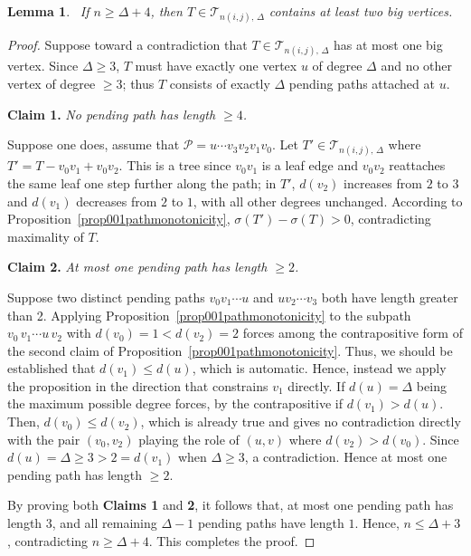 \documentclass[12pt]{amsart}
\newtheorem{lemma}[theorem]{Lemma}
\newcommand{\TT}{\mathcal{T}}
\begin{document}
\begin{lemma}~\label{lem43twobigvertices}
If $n\ge \Delta+4$, then $T\in \TT_{n(i,j),\,\Delta}$ contains at least two big vertices.
\end{lemma}
\begin{proof}
Suppose toward a contradiction that $T\in \TT_{n(i,j),\,\Delta}$ has at most one big vertex. Since $\Delta\geqslant 3$, $T$ must have exactly one vertex $u$ of degree $\Delta$ and no
other vertex of degree $\ge 3$; thus $T$ consists of exactly $\Delta$ pending
paths attached at $u$.

\medskip

\noindent \textbf{Claim 1.} \textit{No pending path has length $\ge 4$.}  

Suppose one does, assume that $\mathcal P = u\cdots v_3v_2v_1v_0$. Let $T'\in \TT_{n(i,j),\,\Delta}$ where 
$T'=T-v_0v_1+v_0v_2$. This is a tree since $v_0v_1$ is a leaf edge and
$v_0v_2$ reattaches the same leaf one step further along the path; in $T'$,
$d(v_2)$ increases from $2$ to $3$ and $d(v_1)$ decreases from $2$ to $1$,
with all other degrees unchanged. According to Proposition~\ref{prop001pathmonotonicity},  $\sigma(T')-\sigma(T)>0$, contradicting maximality of $T$.

\medskip

\noindent \textbf{Claim 2.} \textit{At most one pending path has length $\geqslant 2$.}  

Suppose two distinct pending paths $v_0v_1\cdots u$ and $u v_2\cdots v_3$ both have length
greater than 2. Applying Proposition~\ref{prop001pathmonotonicity} to the subpath
$v_0\,v_1\cdots u\,v_2$  with $d(v_0)=1<d(v_2)=2$ forces among the contrapositive form of
the second claim of Proposition~\ref{prop001pathmonotonicity}. Thus, we should be established that $d(v_1)\leqslant d(u)$, which is automatic. Hence,  instead we apply the
proposition in the direction that constrains $v_1$ directly. If $d(u)=\Delta$
being the maximum possible degree forces, by the contrapositive if $d(v_1)>d(u)$. Then, $d(v_0)\leqslant d(v_2)$,
which is already true and gives no contradiction directly with the pair $(v_0,v_2)$ playing the role of $(u,v)$ where $d(v_2)>d(v_0)$. Since $d(u)=\Delta\geqslant 3> 2=d(v_1)$ when $\Delta\geqslant 3$, a contradiction. Hence at most one pending path has length
$\geqslant 2$.

\medskip

By proving both \textbf{Claims 1} and \textbf{2}, it follows that,  at most one pending path has length $3$, and all remaining
$\Delta-1$  pending paths have length $1$. Hence, $n\leqslant \Delta+3$, contradicting $n\geqslant \Delta+4$. This completes the proof.
\end{proof}
\end{document}
